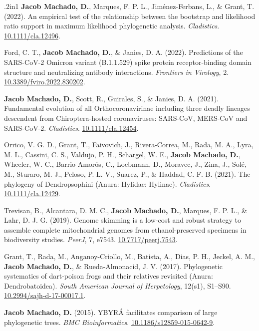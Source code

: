 \documentclass[11pt, letterpaper, sans]{moderncv}
\begin{document}
\begin{hangparas}{.2in}{1}
    \textbf{Jacob Machado, D.}, Marques, F. P. L., Jiménez-Ferbans, L., \& Grant, T. (2022). An empirical test of the relationship between the bootstrap and likelihood ratio support in maximum likelihood phylogenetic analysis. \textit{Cladistics}. \href{https://doi.org/10.1111/cla.12496}{10.1111/cla.12496}.

    Ford, C. T., \textbf{Jacob Machado, D.}, \& Janies, D. A. (2022). Predictions of the SARS-CoV-2 Omicron variant (B.1.1.529) spike protein receptor-binding domain structure and neutralizing antibody interactions. \textit{Frontiers in Virology}, 2. \href{https://doi.org/10.3389/fviro.2022.830202}{10.3389/fviro.2022.830202}.

    \textbf{Jacob Machado, D.}, Scott, R., Guirales, S., \& Janies, D. A. (2021). Fundamental evolution of all Orthocoronavirinae including three deadly lineages descendent from Chiroptera-hosted coronaviruses: SARS-CoV, MERS-CoV and SARS-CoV-2. \textit{Cladistics}. \href{https://doi.org/10.1111/cla.12454}{10.1111/cla.12454}.

    Orrico, V. G. D., Grant, T., Faivovich, J., Rivera‐Correa, M., Rada, M. A., Lyra, M. L., Cassini, C. S., Valdujo, P. H., Schargel, W. E., \textbf{Jacob Machado, D.}, Wheeler, W. C., Barrio‐Amorós, C., Loebmann, D., Moravec, J., Zina, J., Solé, M., Sturaro, M. J., Peloso, P. L. V., Suarez, P., \& Haddad, C. F. B. (2021). The phylogeny of Dendropsophini (Anura: Hylidae: Hylinae). \textit{Cladistics}. \href{https://doi.org/10.1111/cla.12429}{10.1111/cla.12429}.

    Trevisan, B., Alcantara, D. M. C., \textbf{Jacob Machado, D.}, Marques, F. P. L., \& Lahr, D. J. G. (2019). Genome skimming is a low-cost and robust strategy to assemble complete mitochondrial genomes from ethanol-preserved specimens in biodiversity studies. \textit{PeerJ}, 7, e7543. \href{https://doi.org/10.7717/peerj.7543}{10.7717/peerj.7543}.

    Grant, T., Rada, M., Anganoy-Criollo, M., Batista, A., Dias, P. H., Jeckel, A. M., \textbf{Jacob Machado, D.}, \& Rueda-Almonacid, J. V. (2017). Phylogenetic systematics of dart-poison frogs and their relatives revisited (Anura: Dendrobatoidea). \textit{South American Journal of Herpetology}, 12(s1), S1--S90. \href{https://doi.org/10.2994/sajh-d-17-00017.1}{10.2994/sajh-d-17-00017.1}.

    \textbf{Jacob Machado, D.} (2015). YBYRÁ facilitates comparison of large phylogenetic trees. \textit{BMC Bioinformatics}. \href{https://doi.org/10.1186/s12859-015-0642-9}{10.1186/s12859-015-0642-9}.

    \end{hangparas}
\end{document}
